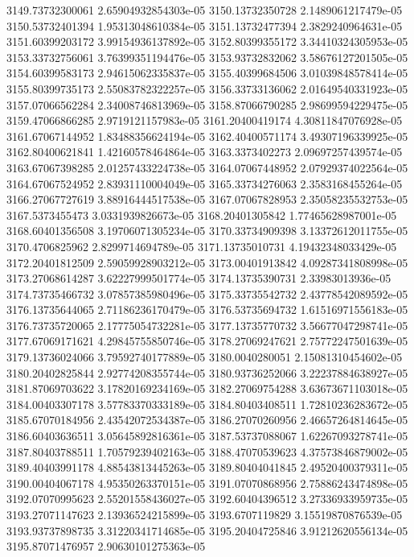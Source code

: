 {3149.73732300061 2.65904932854303e-05
3150.13732350728 2.1489061217479e-05
3150.53732401394 1.95313048610384e-05
3151.13732477394 2.3829240964631e-05
3151.60399203172 3.99154936137892e-05
3152.80399355172 3.34410324305953e-05
3153.33732756061 3.76399351194476e-05
3153.93732832062 3.58676127201505e-05
3154.60399583173 2.94615062335837e-05
3155.40399684506 3.01039848578414e-05
3155.80399735173 2.55083782322257e-05
3156.33733136062 2.01649540331923e-05
3157.07066562284 2.34008746813969e-05
3158.87066790285 2.98699594229475e-05
3159.47066866285 2.9719121157983e-05
3161.20400419174 4.30811847076928e-05
3161.67067144952 1.83488356624194e-05
3162.40400571174 3.49307196339925e-05
3162.80400621841 1.42160578464864e-05
3163.3373402273 2.09697257439574e-05
3163.67067398285 2.01257433224738e-05
3164.07067448952 2.07929374022564e-05
3164.67067524952 2.83931110004049e-05
3165.33734276063 2.3583168455264e-05
3166.27067727619 3.88916444517538e-05
3167.07067828953 2.35058235532753e-05
3167.5373455473 3.0331939826673e-05
3168.20401305842 1.77465628987001e-05
3168.60401356508 3.19706071305234e-05
3170.33734909398 3.13372612011755e-05
3170.4706825962 2.8299714694789e-05
3171.13735010731 4.19432348033429e-05
3172.20401812509 2.59059928903212e-05
3173.00401913842 4.09287341808998e-05
3173.27068614287 3.62227999501774e-05
3174.13735390731 2.33983013936e-05
3174.73735466732 3.07857385980496e-05
3175.33735542732 2.43778542089592e-05
3176.13735644065 2.71186236170479e-05
3176.53735694732 1.61516971556183e-05
3176.73735720065 2.17775054732281e-05
3177.13735770732 3.56677047298741e-05
3177.67069171621 4.29845755850746e-05
3178.27069247621 2.75772247501639e-05
3179.13736024066 3.79592740177889e-05
3180.0040280051 2.15081310454602e-05
3180.20402825844 2.92774208355744e-05
3180.93736252066 3.22237884638927e-05
3181.87069703622 3.17820169234169e-05
3182.27069754288 3.63673671103018e-05
3184.00403307178 3.57783370333189e-05
3184.80403408511 1.72810236283672e-05
3185.67070184956 2.43542072534387e-05
3186.27070260956 2.46657264814645e-05
3186.60403636511 3.05645892816361e-05
3187.53737088067 1.62267093278741e-05
3187.80403788511 1.70579239402163e-05
3188.47070539623 4.37573846879002e-05
3189.40403991178 4.88543813445263e-05
3189.80404041845 2.49520400379311e-05
3190.00404067178 4.95350263370151e-05
3191.07070868956 2.75886243474898e-05
3192.07070995623 2.55201558436027e-05
3192.60404396512 3.27336933959735e-05
3193.27071147623 2.13936524215899e-05
3193.6707119829 3.15519870876539e-05
3193.93737898735 3.31220341714685e-05
3195.20404725846 3.91212620556134e-05
3195.87071476957 2.90630101275363e-05
}

